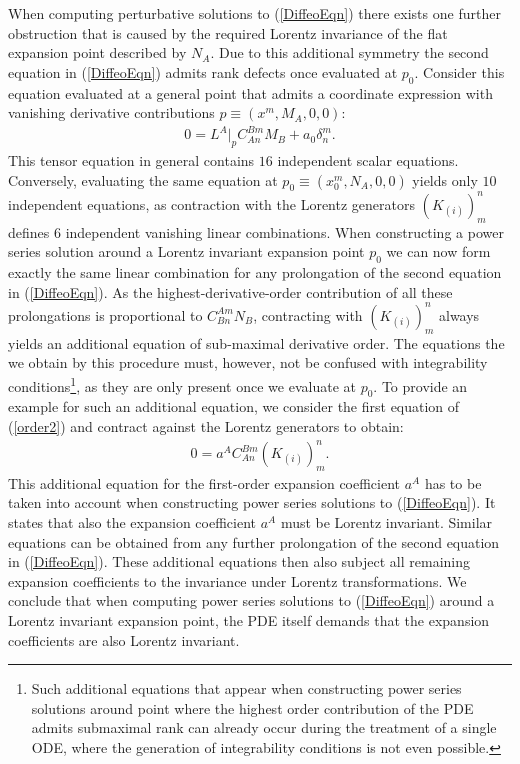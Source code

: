 \documentclass[%
 reprint,
nofootinbib,
 amsmath,amssymb,
 aps,
 prd,
floatfix,
]{revtex4-2}
\begin{document}
When computing perturbative solutions to (\ref{DiffeoEqn})  there exists one further obstruction that is caused by the required Lorentz invariance of the flat expansion point described by $N_A$. Due to this additional symmetry the second equation in (\ref{DiffeoEqn}) admits rank defects once evaluated at $p_0$. Consider this equation evaluated at a general point that admits a coordinate expression with vanishing derivative contributions $p \equiv (x^m,M_A,0,0)$:
\begin{align}
0 = L^A \big \vert_{p} C_{An}^{Bm}M_B + a_0 \delta^m_n.
\end{align}
This tensor equation in general contains $16$ independent scalar equations. Conversely, evaluating the same equation at $p_0\equiv (x_0^m, N_A,0,0)$ yields only $10$ independent equations, as contraction with the Lorentz generators $(K_{(i)})^n_m$ defines $6$ independent vanishing linear combinations.
When constructing a power series solution around a Lorentz invariant expansion point $p_0$ we can now form exactly the same linear combination for any prolongation of the second equation in (\ref{DiffeoEqn}). As the highest-derivative-order contribution of all these prolongations is proportional to $C^{Am}_{Bn}N_B$, contracting with $(K_{(i)})^n_m$ always yields an additional equation of sub-maximal derivative order. The equations the we obtain by this procedure must, however, not be confused with integrability conditions\footnote{Such additional equations that appear when constructing power series solutions around point where the highest order contribution of the PDE admits submaximal rank can already occur during the treatment of a single ODE, where the generation of integrability conditions is not even possible.}, as they are only present once we evaluate at $p_0$. To provide an example for such an additional equation, we consider the first equation of (\ref{order2}) and contract against the Lorentz generators to obtain:
\begin{align}\label{ansatz1}
    0 = a^A C^{Bm}_{An}  (K_{(i)})^n_m.
\end{align}
This additional equation for the first-order expansion coefficient $a^A$ has to be taken into account when constructing power series solutions to (\ref{DiffeoEqn}).
It states that also the expansion coefficient $a^A$ must be Lorentz invariant. 
Similar equations can be obtained from any further prolongation of the second equation in (\ref{DiffeoEqn}). These additional equations then also subject all remaining expansion coefficients to the invariance under Lorentz transformations.
We conclude that when computing power series solutions to (\ref{DiffeoEqn}) around a Lorentz invariant expansion point, the PDE itself demands that the expansion coefficients are also Lorentz invariant.
\end{document}
